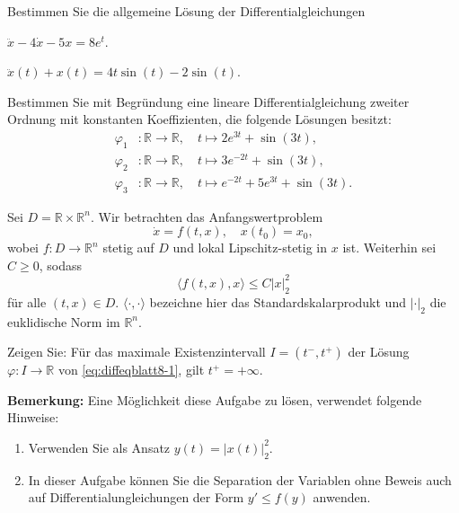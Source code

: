 \begin{Problem}
	Bestimmen Sie die allgemeine Lösung der Differentialgleichungen
	\begin{parts}
		\item $\ddot{x} - 4\dot{x} - 5x = 8e^t$.
		\item $\ddot{x}(t) + x(t) = 4t \sin(t) - 2 \sin(t)$.
	\end{parts}
\end{Problem}

\begin{Problem}
	Bestimmen Sie mit Begründung eine lineare Differentialgleichung zweiter Ordnung mit konstanten Koeffizienten, die folgende Lösungen besitzt:
	\begin{align*}
	\varphi_1 &: \mathbb{R} \to \mathbb{R}, \quad t \mapsto 2e^{3t} + \sin(3t),\\
	\varphi_2 &: \mathbb{R} \to \mathbb{R}, \quad t \mapsto 3e^{-2t} + \sin(3t),\\
	\varphi_3 &: \mathbb{R} \to \mathbb{R}, \quad t \mapsto e^{-2t} + 5e^{3t} + \sin(3t).
	\end{align*}	
\end{Problem}

\begin{Problem}
	Sei $D = \mathbb{R} \times \mathbb{R}^n$. Wir betrachten das Anfangswertproblem
	\begin{equation}\label{eq:diffeqblatt8-1}
		\dot{x} = f(t, x), \quad x(t_0) = x_0, \tag{1}
	\end{equation}
	wobei $f : D \to \mathbb{R}^n$ stetig auf $D$ und lokal Lipschitz-stetig in $x$ ist. Weiterhin sei $C \geq 0$, sodass
	\[
	\langle f(t, x), x \rangle \leq C|x|_2^2
	\]
	für alle $(t, x) \in D$. $\langle \cdot, \cdot \rangle$ bezeichne hier das Standardskalarprodukt und $|\cdot|_2$ die euklidische Norm im $\mathbb{R}^n$.
	
	Zeigen Sie: Für das maximale Existenzintervall $I = (t^-, t^+)$ der Lösung $\varphi : I \to \mathbb{R}$ von \eqref{eq:diffeqblatt8-1}, gilt $t^+ = +\infty$.
	
	\textbf{Bemerkung:} Eine Möglichkeit diese Aufgabe zu lösen, verwendet folgende Hinweise:
	\begin{enumerate}
		\item Verwenden Sie als Ansatz $y(t) = |x(t)|_2^2$.
		\item In dieser Aufgabe können Sie die Separation der Variablen ohne Beweis auch auf Differentialungleichungen der Form $y' \leq f(y)$ anwenden.
	\end{enumerate}
	\end{Problem}
	
